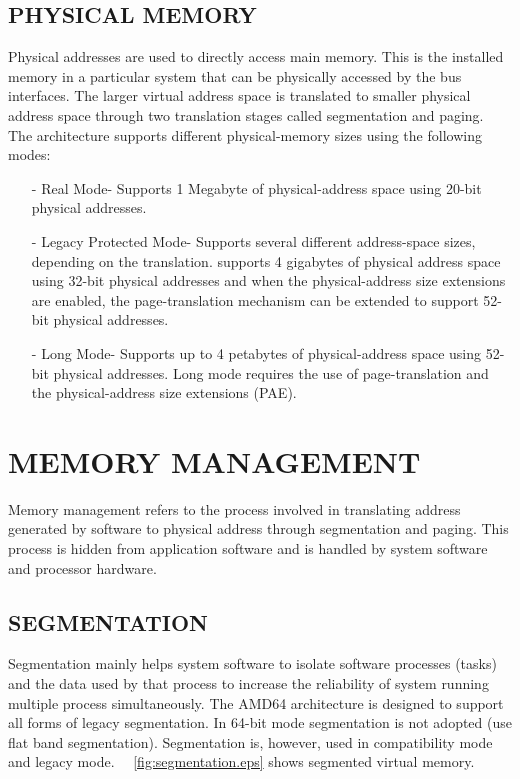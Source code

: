 \subsection {PHYSICAL MEMORY}
Physical addresses are used to directly access main memory. This is the installed memory in a particular system that can be physically accessed by the bus interfaces. The larger virtual address space is translated to smaller physical address space through two translation stages called segmentation and paging. The architecture supports different physical-memory sizes using the following modes:
\begin{itemize}

\item[-] Real Mode- Supports 1 Megabyte of physical-address space using 20-bit physical addresses.
\item[-] Legacy Protected Mode- Supports several different address-space sizes, depending on the translation. supports 4 gigabytes of physical address space using 32-bit physical addresses and when the physical-address size extensions are enabled, the page-translation mechanism can be extended to support 52-bit physical addresses.
\item[-] Long Mode- Supports up to 4 petabytes of physical-address space using 52-bit physical addresses. Long mode requires the use of page-translation and the physical-address size extensions (PAE).
\end{itemize}

\section{MEMORY MANAGEMENT}


Memory management refers to the process involved in translating address generated by software to physical address through segmentation and paging. This process is hidden from application software and is handled by system software and processor hardware. 

\subsection{SEGMENTATION} 
Segmentation mainly helps system software to isolate software processes (tasks) and the data used by that process to increase the reliability of system running multiple process simultaneously. The AMD64 architecture is designed to support all forms of legacy segmentation. In 64-bit mode segmentation is not adopted (use flat band segmentation). Segmentation is, however, used in compatibility mode and legacy mode. 
~\figurename {~\ref{fig:segmentation.eps}} shows segmented virtual memory.

